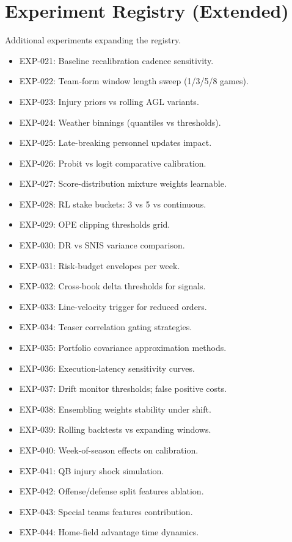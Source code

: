 \documentclass[12pt]{report}  %
\numberwithin{equation}{section}
\theoremstyle{plain}
\theoremstyle{definition}
\theoremstyle{remark}
\begin{document}
\chapter{Experiment Registry (Extended)}
Additional experiments expanding the registry.
\begin{itemize}
  \item EXP-021: Baseline recalibration cadence sensitivity.
  \item EXP-022: Team-form window length sweep (1/3/5/8 games).
  \item EXP-023: Injury priors vs rolling AGL variants.
  \item EXP-024: Weather binnings (quantiles vs thresholds).
  \item EXP-025: Late-breaking personnel updates impact.
  \item EXP-026: Probit vs logit comparative calibration.
  \item EXP-027: Score-distribution mixture weights learnable.
  \item EXP-028: RL stake buckets: 3 vs 5 vs continuous.
  \item EXP-029: OPE clipping thresholds grid.
  \item EXP-030: DR vs SNIS variance comparison.
  \item EXP-031: Risk-budget envelopes per week.
  \item EXP-032: Cross-book delta thresholds for signals.
  \item EXP-033: Line-velocity trigger for reduced orders.
  \item EXP-034: Teaser correlation gating strategies.
  \item EXP-035: Portfolio covariance approximation methods.
  \item EXP-036: Execution-latency sensitivity curves.
  \item EXP-037: Drift monitor thresholds; false positive costs.
  \item EXP-038: Ensembling weights stability under shift.
  \item EXP-039: Rolling backtests vs expanding windows.
  \item EXP-040: Week-of-season effects on calibration.
  \item EXP-041: QB injury shock simulation.
  \item EXP-042: Offense/defense split features ablation.
  \item EXP-043: Special teams features contribution.
  \item EXP-044: Home-field advantage time dynamics.

\end{itemize}
\end{document}
